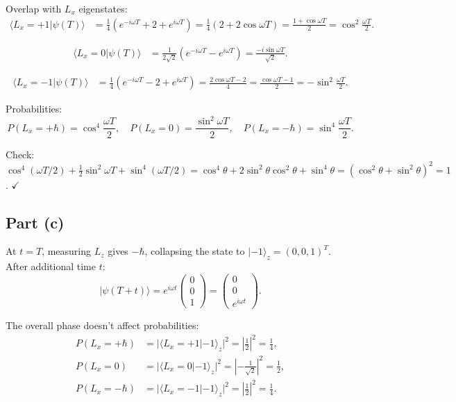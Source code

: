 \documentclass[12pt]{article}
\begin{document}
Overlap with $L_x$ eigenstates:
\begin{align}
\langle L_x = +1|\psi(T)\rangle &= \frac{1}{4}(e^{-i\omega T} + 2 + e^{i\omega T}) = \frac{1}{4}(2 + 2\cos\omega T) = \frac{1+\cos\omega T}{2} = \cos^2\frac{\omega T}{2}.
\end{align}

\begin{align}
\langle L_x = 0|\psi(T)\rangle &= \frac{1}{2\sqrt{2}}(e^{-i\omega T} - e^{i\omega T}) = \frac{-i\sin\omega T}{\sqrt{2}}.
\end{align}

\begin{align}
\langle L_x = -1|\psi(T)\rangle &= \frac{1}{4}(e^{-i\omega T} - 2 + e^{i\omega T}) = \frac{2\cos\omega T - 2}{4} = \frac{\cos\omega T - 1}{2} = -\sin^2\frac{\omega T}{2}.
\end{align}

Probabilities:
\[
\boxed{P(L_x = +\hbar) = \cos^4\frac{\omega T}{2}, \quad P(L_x = 0) = \frac{\sin^2\omega T}{2}, \quad P(L_x = -\hbar) = \sin^4\frac{\omega T}{2}.}
\]

Check: $\cos^4(\omega T/2) + \frac{1}{2}\sin^2\omega T + \sin^4(\omega T/2) = \cos^4\theta + 2\sin^2\theta\cos^2\theta + \sin^4\theta = (\cos^2\theta + \sin^2\theta)^2 = 1$. $\checkmark$

\subsection*{Part (c)}

At $t = T$, measuring $L_z$ gives $-\hbar$, collapsing the state to $|-1\rangle_z = (0,0,1)^T$. After additional time $t$:
\[
|\psi(T+t)\rangle = e^{i\omega t}\begin{pmatrix}0\\0\\1\end{pmatrix} = \begin{pmatrix}0\\0\\e^{i\omega t}\end{pmatrix}.
\]

The overall phase doesn't affect probabilities:
\begin{align}
P(L_x = +\hbar) &= |\langle L_x=+1|{-1}\rangle_z|^2 = \left|\frac{1}{2}\right|^2 = \frac{1}{4}, \\
P(L_x = 0) &= |\langle L_x=0|{-1}\rangle_z|^2 = \left|-\frac{1}{\sqrt{2}}\right|^2 = \frac{1}{2}, \\
P(L_x = -\hbar) &= |\langle L_x=-1|{-1}\rangle_z|^2 = \left|\frac{1}{2}\right|^2 = \frac{1}{4}.
\end{align}
\end{document}
